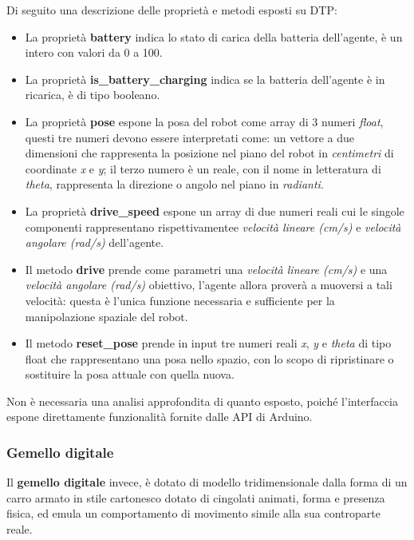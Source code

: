 \bigbreak
Di seguito una descrizione delle proprietà e metodi esposti su DTP:

\begin{itemize}
	\item La proprietà \textbf{battery} indica lo stato di carica della batteria dell'agente, è un intero con valori da 0 a 100.
	\item La proprietà \textbf{is\_battery\_charging} indica se la batteria dell'agente è in ricarica, è di tipo booleano.
	\item La proprietà \textbf{pose} espone la posa del robot come array di 3 numeri \textit{float}, questi tre numeri devono essere interpretati come: un vettore a due dimensioni che rappresenta la posizione nel piano del robot in \textit{centimetri} di coordinate \textit{x} e \textit{y}; il terzo numero è un reale, con il nome in letteratura di \textit{theta}, rappresenta la direzione o angolo nel piano in \textit{radianti}.
	\item La proprietà \textbf{drive\_speed} espone un array di due numeri reali cui le singole componenti rappresentano rispettivamentee \textit{velocità lineare (cm/s)} e \textit{velocità angolare (rad/s)} dell'agente.
	\item Il metodo \textbf{drive} prende come parametri una \textit{velocità lineare (cm/s)} e una \textit{velocità angolare (rad/s)} obiettivo, l'agente allora proverà a muoversi a tali velocità: questa è l'unica funzione necessaria e sufficiente per la manipolazione spaziale del robot.
	\item Il metodo \textbf{reset\_pose} prende in input tre numeri reali \textit{x}, \textit{y} e \textit{theta} di tipo float che rappresentano una posa nello spazio, con lo scopo di ripristinare o sostituire la posa attuale con quella nuova. 
\end{itemize}

Non è necessaria una analisi approfondita di quanto esposto, poiché l'interfaccia espone direttamente funzionalità fornite dalle API di Arduino.

\subsubsection*{Gemello digitale}

Il \textbf{gemello digitale} invece, è dotato di modello tridimensionale dalla forma di un carro armato in stile cartonesco dotato di cingolati animati, forma e presenza fisica, ed emula un comportamento di movimento simile alla sua controparte reale.

